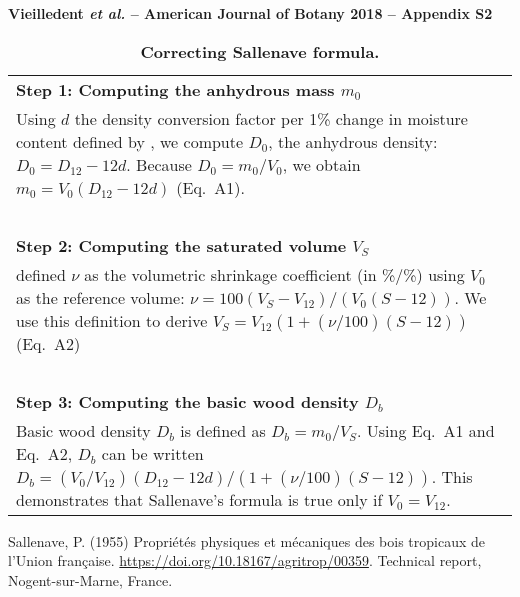 \documentclass[a4paper, 12pt, leqno, dvipsnames]{article}\usepackage[]{graphicx}\usepackage[]{color}
\title{}
\author{}
\date{}
\begin{document}
\thispagestyle{empty} %
\begin{center}
\textbf{Vieilledent \emph{et al.} -- American Journal of Botany 2018 -- Appendix S2}
\end{center}

\setcounter{table}{1}
\renewcommand{\tablename}{Appendix}
\renewcommand{\thetable}{S\arabic{table}}
\renewcommand{\theHtable}{Appendix.\thetable}

\vspace{1cm}

\begin{longtable}{@{}L{\textwidth}@{}}
  \caption{\textbf{Correcting Sallenave formula.}}\label{sm:Correction}\\
  \textbf{Step 1: Computing the anhydrous mass $m_0$}\\
  Using $d$ the density conversion factor per 1\% change in moisture content defined by \citet{Sallenave1955},
  we compute $D_0$, the anhydrous density: $D_0=D_{12}-12d$.
  Because $D_0=m_0/V_0$, we obtain $m_0=V_0 (D_{12}-12d)$ (Eq.~A1).\\
  ~\\
  \textbf{Step 2: Computing the saturated volume $V_S$}\\
  \citet{Sallenave1955} defined $\nu$ as the volumetric shrinkage coefficient (in \%/\%) using $V_0$
  as the reference volume: $\nu=100(V_S-V_{12})/(V_0 (S-12))$.
  We use this definition to derive $V_S=V_{12}(1+(\nu/100)(S-12))$ (Eq.~A2)\\
  ~\\
  \textbf{Step 3: Computing the basic wood density $D_b$}\\
  Basic wood density $D_b$ is defined as $D_b=m_0/V_S$. Using Eq.~A1 and Eq.~A2, $D_b$ can
  be written $D_b=(V_0/V_{12})(D_{12}-12d)/(1+(\nu/100)(S-12))$.
  This demonstrates that Sallenave's formula is true only if $V_0=V_{12}$.\\
\end{longtable}

\renewcommand\refname{Literature Cited}
\begin{thebibliography}{1}
\providecommand{\natexlab}[1]{#1}

Sallenave, P. (1955) {Propriétés physiques et mécaniques des bois tropicaux
  de l'Union française. \url{https://doi.org/10.18167/agritrop/00359}}.
\newblock Technical report, Nogent-sur-Marne, France.

\end{thebibliography}
\end{document}
